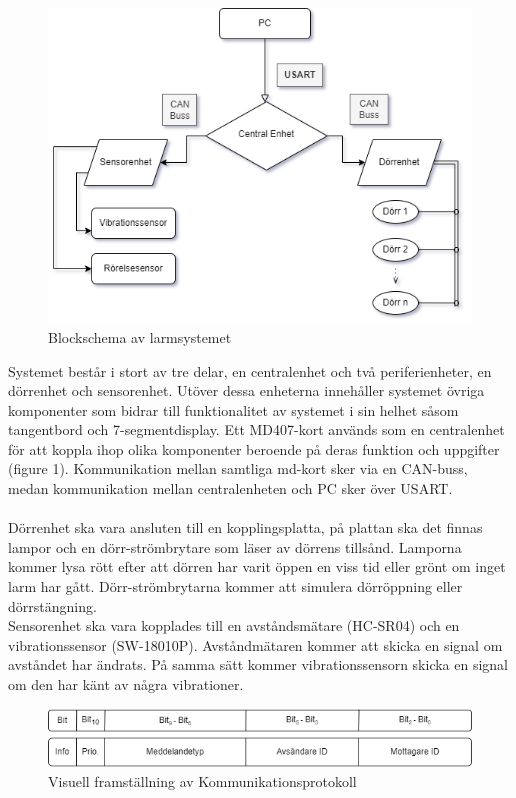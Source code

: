 \documentclass{article}
\begin{document}
\begin{figure}[h]
    \centering
    \includegraphics[scale=0.8]{Projektrapport/diagram.png}
    \caption {Blockschema av larmsystemet}
    \label{fig:drawing}
\end{figure}

Systemet består i stort av tre delar, en centralenhet och två periferienheter, en dörrenhet och sensorenhet. 
Utöver dessa enheterna innehåller systemet övriga komponenter som bidrar till funktionalitet av systemet i sin helhet såsom tangentbord och 7-segmentdisplay. Ett MD407-kort används som en centralenhet för att koppla ihop olika komponenter beroende på deras funktion och uppgifter (figure 1).
Kommunikation mellan samtliga md-kort sker via en CAN-buss, medan kommunikation mellan centralenheten och PC sker över USART. \\
\\

Dörrenhet ska vara ansluten till en kopplingsplatta, på plattan ska det finnas lampor och en dörr-strömbrytare som läser av dörrens tillsånd.
Lamporna kommer lysa rött efter att dörren har varit öppen en viss tid eller grönt om inget larm har gått. 
Dörr-strömbrytarna kommer att simulera dörröppning eller dörrstängning. 
\\
Sensorenhet ska vara kopplades till en avståndsmätare (HC-SR04) och en vibrationssensor (SW-18010P). 
Avståndmätaren kommer att skicka en signal om avståndet har ändrats. 
På samma sätt kommer vibrationssensorn skicka en signal om den har känt av några vibrationer. \\

\begin{figure}[h]
    \centering
    \includegraphics[scale=0.5]{Projektrapport/protokoll.png}
    \caption {Visuell framställning av Kommunikationsprotokoll}
    \label{fig:drawing}
\end{figure}
\end{document}
